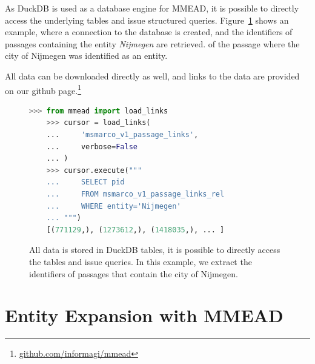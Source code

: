 As DuckDB is used as a database engine for MMEAD, it is possible to directly access the underlying tables and issue structured queries. Figure~\ref{fig:sql_engine} shows an example, where a connection to the database is created, and the identifiers of passages containing the entity \emph{Nijmegen} are retrieved. of the passage where the city of Nijmegen was identified as an entity. 

All data can be downloaded directly as well, and links to the data are provided on our github page.\footnote{\url{github.com/informagi/mmead}}

\begin{figure}[!t]
\begin{lstlisting}[language=python]
	>>> from mmead import load_links
	>>> cursor = load_links(
	...     'msmarco_v1_passage_links',
	...     verbose=False
	... )
	>>> cursor.execute("""
	...     SELECT pid 
	...     FROM msmarco_v1_passage_links_rel 
	...     WHERE entity='Nijmegen'
	... """)
	[(771129,), (1273612,), (1418035,), ... ]
\end{lstlisting}
\caption{All data is stored in DuckDB tables, it is possible to directly access the tables and issue queries. In this example, we extract the identifiers of passages that contain the city of Nijmegen.}
\label{fig:sql_engine}
\end{figure}




\section{Entity Expansion with MMEAD}

